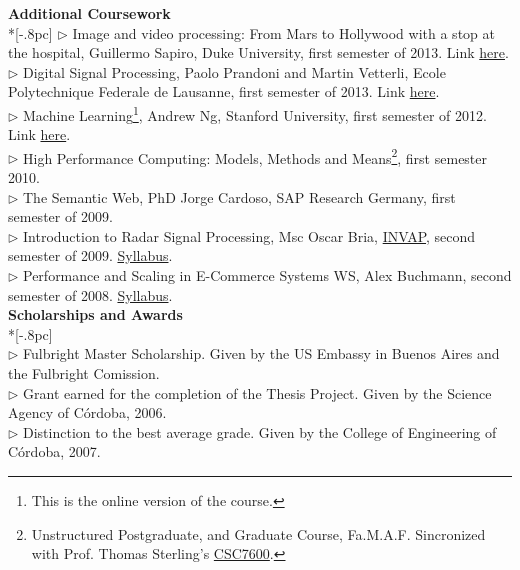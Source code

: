 \documentclass[letter,11pt,english]{article}
\begin{document}
{\large \bf Additional Coursework}\\ *[-.8pc]
\underline{\hspace{6in}}
$\triangleright$ Image and video processing: From Mars to Hollywood with a stop at the hospital, Guillermo Sapiro, Duke University, first semester of 2013. Link \href{https://www.coursera.org/course/images}{here}. \\
$\triangleright$ Digital Signal Processing, Paolo Prandoni and Martin Vetterli, Ecole Polytechnique Federale de Lausanne, first semester of 2013. Link \href{https://www.coursera.org/course/dsp}{here}. \\
$\triangleright$ Machine Learning\footnote{This is the online version of the course.}, Andrew Ng, Stanford University, first semester of 2012. Link \href{http://www.ml-class.org}{here}. \\
$\triangleright$ High Performance Computing: Models, Methods and Means\footnote{Unstructured Postgraduate,
and Graduate Course, Fa.M.A.F. Sincronized with Prof. Thomas Sterling's 
\href{http://www.csc.lsu.edu/Internal_review/2009/Syllabus_CSC_7600_HPC_2008.pdf}{CSC7600}.}, first semester 2010.\\
$\triangleright$ The Semantic Web, PhD Jorge Cardoso, SAP Research Germany, first semester of 2009.\\
$\triangleright$ Introduction to Radar Signal Processing, Msc Oscar Bria, 
\href{http://www.invap.net/index-e.php}{INVAP}, second semester of 2009. \href{http://postgrado.info.unlp.edu.ar/Cursos/Cursos/11-2011_Introduccion_al_Procesamiento_de_Senales_Radar.pdf}{Syllabus}.\\
$\triangleright$ Performance and Scaling in E-Commerce Systems WS, Alex Buchmann, second semester of 2008. 
\href{http://www.dvs.tu-darmstadt.de/teaching/perf/2008/}{Syllabus}.\\


{\bf Scholarships and Awards} \\*[-.8pc]
\underline{\hspace{6in}} \\
$\triangleright$ Fulbright Master Scholarship.
Given by the US Embassy in Buenos Aires and the Fulbright Comission.\\ 
$\triangleright$ Grant earned for the completion of the Thesis Project.
Given by the Science Agency of C\'ordoba, 2006.\\ 
$\triangleright$ Distinction to the best average grade.
Given by the College of Engineering of C\'ordoba, 2007.\\
\end{document}
